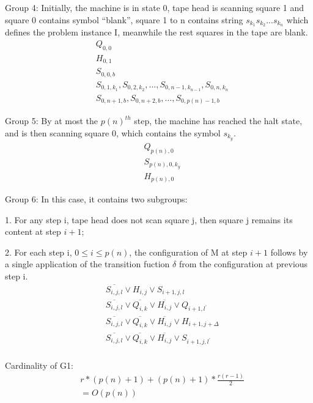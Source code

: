 \documentclass[12pt,a4paper]{report}
\begin{document}
Group 4: Initially, the machine is in state 0, tape head is scanning square 1 and square 0 contains symbol ``blank'', square 1 to n contains string $s_{k_{1}}s_{k_{2}}...s_{k_{n}}$ which defines the problem instance I, meanwhile the rest squares in the tape are blank.
\begin{equation*}
\begin{split}
& Q_{0,0} \\
& H_{0,1} \\
& S_{0,0,b} \\
& S_{0,1,k_{1}} , S_{0,2,k_{2}} , ... , S_{0,n-1,k_{n-1}} , S_{0,n,k_{n}} \\
& S_{0,n+1,b}, S_{0,n+2,b}, ... , S_{0,p(n)-1,b}
\end{split}
\end{equation*}

Group 5: By at most the $p(n)^{th}$ step, the machine has reached the halt state, and is then scanning square 0, which contains the symbol $s_{k_{y}}$.
\begin{equation*}
\begin{split}
& Q_{p(n),0} \\
& S_{p(n),0,k_{y}} \\
& H_{p(n),0}
\end{split}
\end{equation*}

Group 6: In this case, it contains two subgroups:

1. For any step i, tape head does not scan square j, then square j remains its content at step $i+1$;

2. For each step i, $0 \le i \le p(n)$, the configuration of M at step $i+1$ follows by a single application of the transition fuction $\delta$ from the configuration at previous step i.
\begin{equation*}
\begin{split}
& \overline{S_{i,j,l}} \vee H_{i,j} \vee S_{i+1,j,l} \\
& \overline{S_{i,j,l}} \vee \overline{Q_{i,k}} \vee \overline{H_{i,j}} \vee Q_{i+1,l^{'}} \\
& \overline{S_{i,j,l}} \vee \overline{Q_{i,k}} \vee \overline{H_{i,j}} \vee H_{i+1,j+\Delta} \\
& \overline{S_{i,j,l}} \vee \overline{Q_{i,k}} \vee \overline{H_{i,j}} \vee S_{i+1,j,l^{'}} \\
\end{split}
\end{equation*}

Cardinality of G1: 
\begin{equation*}
\begin{split}
& r * (p(n)+1) + (p(n)+1) * \frac {r(r-1)}{2} \\
&= O(p(n))
\end{split}
\end{equation*}
\end{document}
